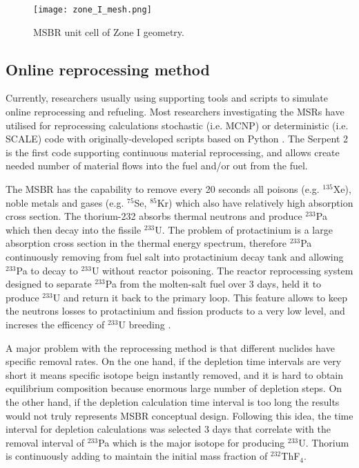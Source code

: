 \documentclass{anstrans}
\begin{document}
\begin{figure}[h] %
  \centering
  \vspace{-0.6em}
  \texttt{[image: zone\_I\_mesh.png]}
  \caption{MSBR unit cell of Zone I geometry.}
  \label{fig:zoneI}
\end{figure}

\subsection{Online reprocessing method}

Currently, researchers usually using supporting tools and scripts to simulate online reprocessing and refueling. Most researchers investigating the \gls{MSR}s have utilised for reprocessing calculations stochastic (i.e. \gls{MCNP}) or deterministic (i.e. SCALE) code with originally-developed scripts based on Python \cite{jeong_equilibrium_2016,park_whole_2015}. The Serpent 2 is the first code supporting continuous material reprocessing, and allows create needed number of material flows into the fuel and/or out from the fuel.

The \gls{MSBR} has the capability to remove every 20 seconds all poisons (e.g. $^{135}$Xe), noble metals and gases (e.g. $^{75}$Se, $^{85}$Kr) which also have relatively high absorption cross section. The thorium-232 absorbs thermal neutrons and produce $^{233}$Pa which then decay into the fissile $^{233}$U. The problem of protactinium is a large absorption cross section in the thermal energy spectrum, therefore $^{233}$Pa continuously removing from fuel salt into protactinium decay tank and allowing $^{233}$Pa to decay to $^{233}$U without reactor poisoning. The reactor reprocessing system designed to separate $^{233}$Pa from the molten-salt fuel over 3 days, held it to produce $^{233}$U and return it back to the primary loop. This feature allows to keep the neutrons losses to protactinium and fission products to a very low level, and increses the efficency of $^{233}$U breeding \cite{robertson_conceptual_1971}.

A major problem with the reprocessing method is that different nuclides have specific removal rates. On the one hand, if the depletion time intervals are very short it means specific isotope beign instantly removed, and it is hard to obtain equilibrium composition because enormous large number of depletion steps. On the other hand, if the depletion calculation time interval is too long the results would not truly represents \gls{MSBR} conceptual design. Following this idea, the time interval for depletion calculations was selected 3 days that correlate with the removal interval of $^{233}$Pa which is the major isotope for producing $^{233}$U. Thorium is continuously adding to maintain the initial mass fraction of $^{232}$ThF$_4$.
\end{document}
